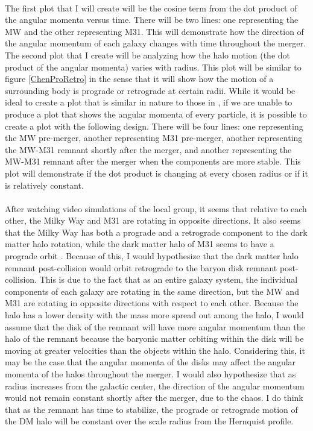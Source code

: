 \documentclass[fleqn,usenatbib]{mnras}
\begin{document}
\paragraph{} The first plot that I will create will be the cosine term from the dot product of the angular momenta versus time. There will be two lines: one representing the MW and the other representing M31. This will demonstrate how the direction of the angular momentum of each galaxy changes with time throughout the merger. The second plot that I create will be analyzing how the halo motion (the dot product of the angular momenta) varies with radius. This plot will be similar to figure \ref{ChenProRetro} in the sense that it will show how the motion of a surrounding body is prograde or retrograde at certain radii. While it would be ideal to create a plot that is similar in nature to those in \citep{Chen+2022}, if we are unable to produce a plot that shows the angular momenta of every particle, it is possible to create a plot with the following design. There will be four lines: one representing the MW pre-merger, another representing M31 pre-merger, another representing the MW-M31 remnant shortly after the merger, and another representing the MW-M31 remnant after the merger when the components are more stable. This plot will demonstrate if the dot product is changing at every chosen radius or if it is relatively constant.

\paragraph{} After watching video simulations of the local group, it seems that relative to each other, the Milky Way and M31 are rotating in opposite directions. It also seems that the Milky Way has both a prograde and a retrograde component to the dark matter halo rotation, while the dark matter halo of M31 seems to have a prograde orbit \citep{Deason+2011}. Because of this, I would hypothesize that the dark matter halo remnant post-collision would orbit retrograde to the baryon disk remnant post-collision. This is due to the fact that as an entire galaxy system, the individual components of each galaxy are rotating in the same direction, but the MW and M31 are rotating in opposite directions with respect to each other. Because the halo has a lower density with the mass more spread out among the halo, I would assume that the disk of the remnant will have more angular momentum than the halo of the remnant because the baryonic matter orbiting within the disk will be moving at greater velocities than the objects within the halo. Considering this, it may be the case that the angular momenta of the disks may affect the angular momenta of the halos throughout the merger. I would also hypothesize that as radius increases from the galactic center, the direction of the angular momentum would not remain constant shortly after the merger, due to the chaos. I do think that as the remnant has time to stabilize, the prograde or retrograde motion of the DM halo will be constant over the scale radius from the Hernquist profile. 
\end{document}
